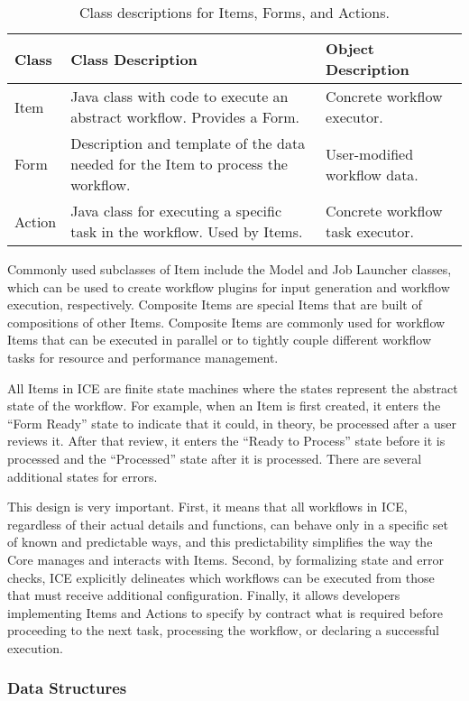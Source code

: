 \begin{table*}[t]
\begin{tabularx}{\textwidth}{|l|X|l|}
\hline
Class & Class Description & Object Description\tabularnewline\hline
Item & Java class with code to execute an abstract workflow. Provides a
Form. & Concrete workflow executor.\tabularnewline\hline
Form & Description and template of the data needed for the Item to
process the workflow. & User-modified workflow data.\tabularnewline\hline
Action & Java class for executing a specific task in the workflow. Used
by Items. & Concrete workflow task executor.\tabularnewline\hline
\end{tabularx}
\caption{Class descriptions for Items, Forms, and Actions.}
\end{table*}

Commonly used subclasses of Item include the Model and Job Launcher classes,
which can be  used to create workflow plugins for input generation and workflow
execution, respectively. Composite Items are special Items that are built of
compositions of other Items. Composite Items are commonly used for workflow
Items that can be executed in parallel or to tightly couple different workflow
tasks for resource and performance management.

All Items in ICE are finite state machines where the states represent
the abstract state of the workflow. For example, when an Item is first
created, it enters the ``Form Ready'' state to indicate that it could,
in theory, be processed after a user reviews it. After that review, it
enters the ``Ready to Process'' state before it is processed and 
the ``Processed'' state after it is processed. There are several additional 
states for errors.

This design is very important. First, it means that all workflows in
ICE, regardless of their actual details and functions, can behave only in
a specific set of known and predictable ways, and this predictability 
simplifies the way the Core manages and interacts with Items. Second, by
formalizing state and error checks, ICE explicitly delineates which workflows 
can be executed from those that must receive additional configuration. 
Finally, it allows developers implementing Items and
Actions to specify by contract what is required before proceeding to the
next task, processing the workflow, or declaring a successful execution.

\subsubsection{Data Structures}

